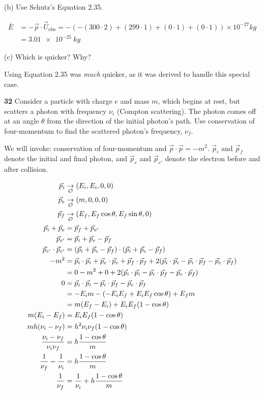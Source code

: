 \documentclass[gr-notes.tex]{subfiles}
\begin{document}
(b) Use Schutz's Equation 2.35.

\begin{align*}
  \bar{E} &=
  - \vec{p} \cdot \vec{U}_{\mathrm{obs}} =
  -(-(300 \cdot 2) +
     (299 \cdot 1) +
     (  0 \cdot 1) +
     (  0 \cdot 1)) \times 10^{-27} \si{kg}
  \\ &=
  \SI{3.01e-25}{kg}
\end{align*}


(c) Which is quicker? Why?

Using Equation 2.35 was \emph{much} quicker, as it was derived to handle this special case.




\textbf{32}
Consider a particle with charge $e$ and mass $m$, which begins at rest, but scatters a photon with frequency $\nu_i$ (Compton scattering). The photon comes off at an angle $\theta$ from the direction of the initial photon's path. Use conservation of four-momentum to find the scattered photon's frequency, $\nu_f$.

We will invoke: conservation of four-momentum and $\vec{p} \cdot \vec{p} = -m^2$. $\vec{p}_i$ and $\vec{p}_f$ denote the initial and final photon, and $\vec{p}_e$ and $\vec{p}_{e'}$ denote the electron before and after collision.

\begin{align*}
  \vec{p}_i &\underset{\mathcal{O}}{\to} (E_i, E_i, 0, 0)
  \\
  \vec{p}_e &\underset{\mathcal{O}}{\to} (m, 0, 0, 0)
  \\
  \vec{p}_f &\underset{\mathcal{O}}{\to} (E_f, E_f \cos\theta, E_f \sin\theta, 0)
  \\
  \vec{p}_i + \vec{p}_e &= \vec{p}_f + \vec{p}_{e'}
  \\
  \vec{p}_{e'} &= \vec{p}_i + \vec{p}_e - \vec{p}_f
  \\
  \vec{p}_{e'} \cdot \vec{p}_{e'} &=
  (\vec{p}_i + \vec{p}_e - \vec{p}_f) \cdot (\vec{p}_i + \vec{p}_e - \vec{p}_f)
  \\
  -m^2 &=
  \vec{p}_i \cdot \vec{p}_i +
  \vec{p}_e \cdot \vec{p}_e +
  \vec{p}_f \cdot \vec{p}_f +
  2 (\vec{p}_i \cdot \vec{p}_i -
     \vec{p}_i \cdot \vec{p}_f -
     \vec{p}_e \cdot \vec{p}_f)
  \\ &=
  0 - m^2 + 0 +
  2 (\vec{p}_i \cdot \vec{p}_i -
     \vec{p}_i \cdot \vec{p}_f -
     \vec{p}_e \cdot \vec{p}_f)
  \\
  0 &=
  \vec{p}_i \cdot \vec{p}_i -
  \vec{p}_i \cdot \vec{p}_f -
  \vec{p}_e \cdot \vec{p}_f
  \\ &=
  - E_i m - (-E_i E_f + E_i E_f \cos\theta) + E_f m
  \\ &=
  m (E_f - E_i) + E_i E_f (1 - \cos\theta)
  \\
  m (E_i - E_f) &=
  E_i E_f (1 - \cos\theta)
  \\
  m h (\nu_i - \nu_f) &=
  h^2 \nu_i \nu_f (1 - \cos\theta)
  \\
  \frac{\nu_i - \nu_f}{\nu_i \nu_f} &=
  h \frac{1 - \cos\theta}{m}
  \\
  \frac{1}{\nu_f} - \frac{1}{\nu_i} &=
  h \frac{1 - \cos\theta}{m}
  \\
  \frac{1}{\nu_f} &=
  \frac{1}{\nu_i} +
  h \frac{1 - \cos\theta}{m}
\end{align*}
\end{document}
